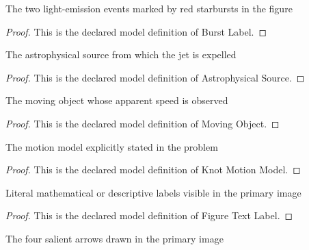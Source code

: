\begin{definition}
  \label{def:physics:phyx-mini-0594:phyxminiproblems-problemphyxmini0594-burstlabel}
  The two light-emission events marked by red starbursts in the figure
\end{definition}
\begin{proof}
  This is the declared model definition of Burst Label.
\end{proof}
\begin{definition}
  \label{def:physics:phyx-mini-0594:phyxminiproblems-problemphyxmini0594-astrophysicalsource}
  The astrophysical source from which the jet is expelled
\end{definition}
\begin{proof}
  This is the declared model definition of Astrophysical Source.
\end{proof}
\begin{definition}
  \label{def:physics:phyx-mini-0594:phyxminiproblems-problemphyxmini0594-movingobject}
  The moving object whose apparent speed is observed
\end{definition}
\begin{proof}
  This is the declared model definition of Moving Object.
\end{proof}
\begin{definition}
  \label{def:physics:phyx-mini-0594:phyxminiproblems-problemphyxmini0594-knotmotionmodel}
  The motion model explicitly stated in the problem
\end{definition}
\begin{proof}
  This is the declared model definition of Knot Motion Model.
\end{proof}
\begin{definition}
  \label{def:physics:phyx-mini-0594:phyxminiproblems-problemphyxmini0594-figuretextlabel}
  Literal mathematical or descriptive labels visible in the primary image
\end{definition}
\begin{proof}
  This is the declared model definition of Figure Text Label.
\end{proof}
\begin{definition}
  \label{def:physics:phyx-mini-0594:phyxminiproblems-problemphyxmini0594-figurearrow}
  The four salient arrows drawn in the primary image
\end{definition}
